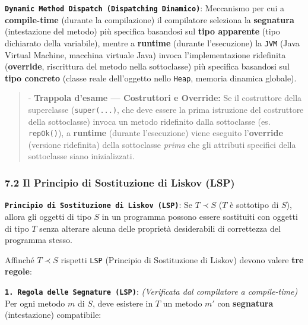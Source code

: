 \textbf{\texttt{Dynamic Method Dispatch (Dispatching Dinamico)}}: Meccanismo per cui a \textbf{compile-time} (durante la compilazione) il compilatore seleziona la \textbf{segnatura} (intestazione del metodo) più specifica basandosi sul \textbf{tipo apparente} (tipo dichiarato della variabile), mentre a \textbf{runtime} (durante l'esecuzione) la \texttt{JVM} (Java Virtual Machine, macchina virtuale Java) invoca l'implementazione ridefinita (\textbf{override}, riscrittura del metodo nella sottoclasse) più specifica basandosi sul \textbf{tipo concreto} (classe reale dell'oggetto nello \texttt{Heap}, memoria dinamica globale).

\begin{quote}\small



- \textbf{Trappola d'esame — Costruttori e Override:} Se il costruttore della superclasse (\texttt{super(...)}, che deve essere la prima istruzione del costruttore della sottoclasse) invoca un metodo ridefinito dalla sottoclasse (es. \texttt{repOk()}), a \textbf{runtime} (durante l'esecuzione) viene eseguito l'\textbf{override} (versione ridefinita) della sottoclasse \emph{prima} che gli attributi specifici della sottoclasse siano inizializzati.

\end{quote}

\subsubsection{7.2 Il Principio di Sostituzione di Liskov (LSP)}\label{7-2-il-principio-di-sostituzione-di-liskov-lsp}

\textbf{\texttt{Principio di Sostituzione di Liskov (LSP)}}: Se $T \prec S$ ($T$ è sottotipo di $S$), allora gli oggetti di tipo $S$ in un programma possono essere sostituiti con oggetti di tipo $T$ senza alterare alcuna delle proprietà desiderabili di correttezza del programma stesso.

Affinché $T \prec S$ rispetti \texttt{LSP} (Principio di Sostituzione di Liskov) devono valere \textbf{tre regole}:

\textbf{\texttt{1. Regola delle Segnature (LSP)}}: \emph{(Verificata dal compilatore a compile-time)} Per ogni metodo $m$ di $S$, deve esistere in $T$ un metodo $m'$ con \textbf{segnatura} (intestazione) compatibile:

